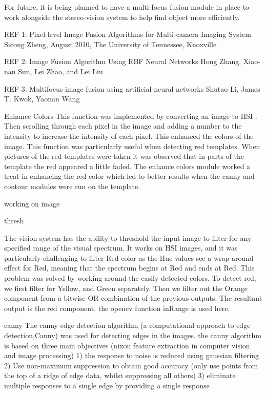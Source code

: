 For future, it is being planned to have a multi-focus fusion module in place to work alongside the stereo-vision system to help find object more efficiently. 

REF 1: Pixel-level Image Fusion Algorithms for Multi-camera Imaging System
Sicong Zheng, August 2010, The University of Tennessee, Knoxville


REF 2: Image Fusion Algorithm Using RBF Neural Networks
Hong Zhang, Xiao-nan Sun, Lei Zhao, and Lei Liu

REF 3: Multifocus image fusion using artificial neural networks
Shutao Li, James T. Kwok, Yaonan Wang

Enhance Colors
This function was implemented by converting an image to HSI . Then scrolling through each pixel in the image and adding a number to the intensity to increase the intensity of each pixel. This enhanced the colors of the image. This function was particularly useful when detecting red templates. When pictures of the red templates were taken it was observed that in parts of the template the red appeared a little faded. The enhance colors module worked a treat in enhancing the red color which led to better results when the canny and contour modules were run on the template. 


working on image 

thresh

The vision system has the ability to threshold the input image to filter for any specified range of the visual spectrum. 
It works on HSI images, and it was particularly challenging to filter Red color as the Hue values see a wrap-around effect for Red, meaning that the spectrum begins at Red and ends at Red.
This problem was solved by working around the easily detected colors.
To detect red, we first filter for Yellow, and Green separately. Then we filter out the Orange component from a bitwise OR-combination of the previous outputs. The resultant output is the red component.
the opencv function inRange is used here.


canny
The canny edge detection algorithm (a computational approach to edge detection,Canny)  was used for detecting edges in the images. the canny algorithm is based on three main objectives (nixon feature extraction in computer vision and image processing)
1) the response to noise is reduced using gaussian filtering
2) Use non-maximum suppression to obtain good accuracy (only use points from the top of a ridge of edge data, whilst suppressing all others) 
3) eliminate multiple responses to a single edge by providing a single response 

